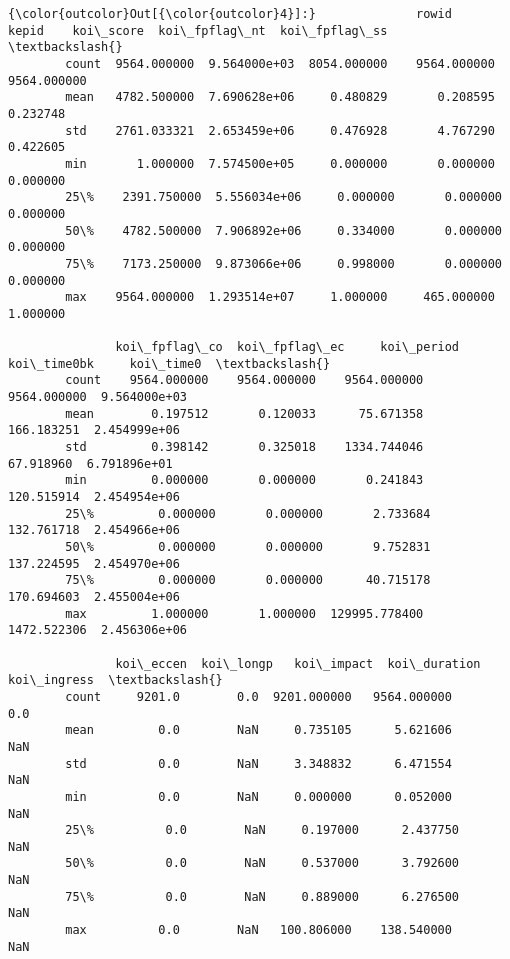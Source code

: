 \documentclass[11pt]{article}
\begin{document}
\begin{Verbatim}[commandchars=\\\{\}]
{\color{outcolor}Out[{\color{outcolor}4}]:}              rowid         kepid    koi\_score  koi\_fpflag\_nt  koi\_fpflag\_ss  \textbackslash{}
        count  9564.000000  9.564000e+03  8054.000000    9564.000000    9564.000000   
        mean   4782.500000  7.690628e+06     0.480829       0.208595       0.232748   
        std    2761.033321  2.653459e+06     0.476928       4.767290       0.422605   
        min       1.000000  7.574500e+05     0.000000       0.000000       0.000000   
        25\%    2391.750000  5.556034e+06     0.000000       0.000000       0.000000   
        50\%    4782.500000  7.906892e+06     0.334000       0.000000       0.000000   
        75\%    7173.250000  9.873066e+06     0.998000       0.000000       0.000000   
        max    9564.000000  1.293514e+07     1.000000     465.000000       1.000000   
        
               koi\_fpflag\_co  koi\_fpflag\_ec     koi\_period  koi\_time0bk     koi\_time0  \textbackslash{}
        count    9564.000000    9564.000000    9564.000000  9564.000000  9.564000e+03   
        mean        0.197512       0.120033      75.671358   166.183251  2.454999e+06   
        std         0.398142       0.325018    1334.744046    67.918960  6.791896e+01   
        min         0.000000       0.000000       0.241843   120.515914  2.454954e+06   
        25\%         0.000000       0.000000       2.733684   132.761718  2.454966e+06   
        50\%         0.000000       0.000000       9.752831   137.224595  2.454970e+06   
        75\%         0.000000       0.000000      40.715178   170.694603  2.455004e+06   
        max         1.000000       1.000000  129995.778400  1472.522306  2.456306e+06   
        
               koi\_eccen  koi\_longp   koi\_impact  koi\_duration  koi\_ingress  \textbackslash{}
        count     9201.0        0.0  9201.000000   9564.000000          0.0   
        mean         0.0        NaN     0.735105      5.621606          NaN   
        std          0.0        NaN     3.348832      6.471554          NaN   
        min          0.0        NaN     0.000000      0.052000          NaN   
        25\%          0.0        NaN     0.197000      2.437750          NaN   
        50\%          0.0        NaN     0.537000      3.792600          NaN   
        75\%          0.0        NaN     0.889000      6.276500          NaN   
        max          0.0        NaN   100.806000    138.540000          NaN   
        

\end{Verbatim}
\end{document}
